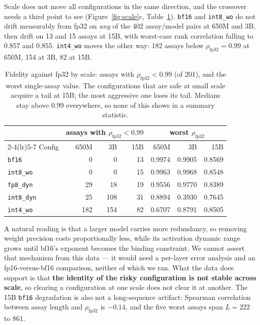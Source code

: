 \documentclass[11pt]{article}
\newcommand{\cfg}[1]{\texttt{#1}}
\begin{document}
Scale does not move all configurations in the same direction, and the crossover
needs a third point to see (Figure~\ref{fig:scale}c, Table~\ref{tab:fid3}).
\cfg{bf16} and \cfg{int8\_wo} do not drift measurably from fp32 on \emph{any} of
the 402 assay/model pairs at 650M and 3B, then drift on 13 and 15 assays at 15B,
with worst-case rank correlation falling to $0.857$ and $0.855$. \cfg{int4\_wo}
moves the other way: 182 assays below $\rho_{\text{fp32}} = 0.99$ at 650M, 154 at
3B, 82 at 15B.

\begin{table}[htb]
\centering
\caption{Fidelity against fp32 by scale: assays with $\rho_{\text{fp32}} < 0.99$
(of 201), and the worst single-assay value. The configurations that are safe at
small scale acquire a tail at 15B; the most aggressive one loses its tail.
Medians stay above $0.99$ everywhere, so none of this shows in a summary
statistic.}
\label{tab:fid3}
\small
\begin{tabular}{lrrrrrr}
\toprule
& \multicolumn{3}{c}{assays with $\rho_{\text{fp32}}<0.99$} & \multicolumn{3}{c}{worst $\rho_{\text{fp32}}$} \\
\cmidrule(lr){2-4}\cmidrule(lr){5-7}
Config & 650M & 3B & 15B & 650M & 3B & 15B \\
\midrule
\cfg{bf16}      &   0 &   0 & 13 & 0.9974 & 0.9905 & 0.8569 \\
\cfg{int8\_wo}  &   0 &   0 & 15 & 0.9963 & 0.9968 & 0.8548 \\
\cfg{fp8\_dyn}  &  29 &  18 & 19 & 0.9556 & 0.9770 & 0.8389 \\
\cfg{int8\_dyn} &  25 & 108 & 31 & 0.8894 & 0.3930 & 0.7645 \\
\cfg{int4\_wo}  & 182 & 154 & 82 & 0.6707 & 0.8791 & 0.8505 \\
\bottomrule
\end{tabular}
\end{table}

A natural reading is that a larger model carries more redundancy, so removing
weight precision costs proportionally less, while its activation dynamic range
grows until bf16's exponent becomes the binding constraint. We cannot assert
that mechanism from this data --- it would need a per-layer error analysis and
an fp16-versus-bf16 comparison, neither of which we ran. What the data does
support is that \textbf{the identity of the risky configuration is not stable
across scale}, so clearing a configuration at one scale does not clear it at
another. The 15B \cfg{bf16} degradation is also not a long-sequence artifact:
Spearman correlation between assay length and $\rho_{\text{fp32}}$ is $-0.14$,
and the five worst assays span $L = 222$ to $861$.
\end{document}
